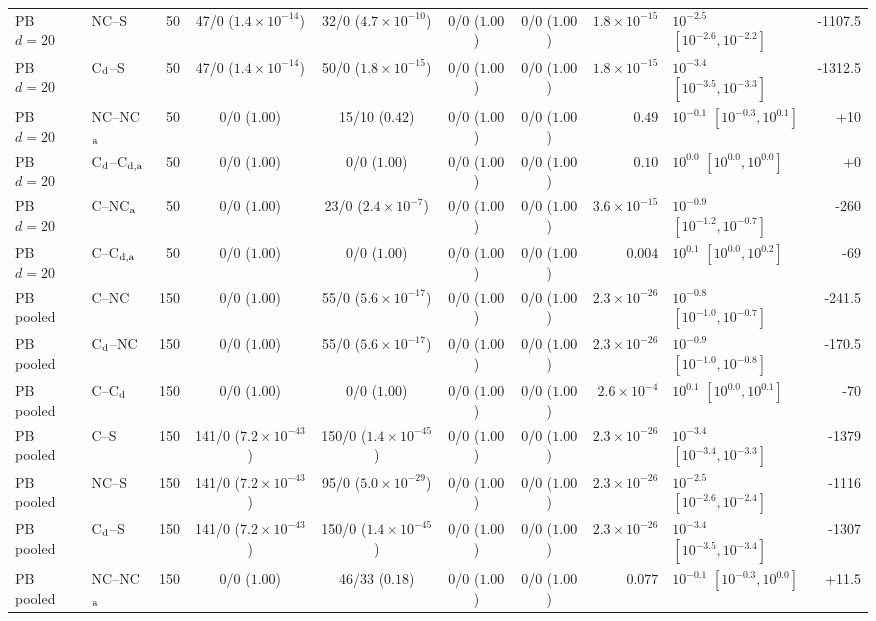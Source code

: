\begin{tabular}{@{}llr cccc r l r@{}}
PB $d=20$ & NC--S & 50 & 47/0 ($1.4\times10^{-14}$) & 32/0 ($4.7\times10^{-10}$) & 0/0 ($1.00$) & 0/0 ($1.00$) & $1.8\times10^{-15}$ & $10^{-2.5}$ $[10^{-2.6},10^{-2.2}]$ & -1107.5\\
PB $d=20$ & C$_{\rm d}$--S & 50 & 47/0 ($1.4\times10^{-14}$) & 50/0 ($1.8\times10^{-15}$) & 0/0 ($1.00$) & 0/0 ($1.00$) & $1.8\times10^{-15}$ & $10^{-3.4}$ $[10^{-3.5},10^{-3.3}]$ & -1312.5\\
PB $d=20$ & NC--NC$_{\rm a}$ & 50 & 0/0 ($1.00$) & 15/10 ($0.42$) & 0/0 ($1.00$) & 0/0 ($1.00$) & $0.49$ & $10^{-0.1}$ $[10^{-0.3},10^{0.1}]$ & +10\\
PB $d=20$ & C$_{\rm d}$--C$_{\rm d,a}$ & 50 & 0/0 ($1.00$) & 0/0 ($1.00$) & 0/0 ($1.00$) & 0/0 ($1.00$) & $0.10$ & $10^{0.0}$ $[10^{0.0},10^{0.0}]$ & +0\\
PB $d=20$ & C--NC$_{\rm a}$ & 50 & 0/0 ($1.00$) & 23/0 ($2.4\times10^{-7}$) & 0/0 ($1.00$) & 0/0 ($1.00$) & $3.6\times10^{-15}$ & $10^{-0.9}$ $[10^{-1.2},10^{-0.7}]$ & -260\\
PB $d=20$ & C--C$_{\rm d,a}$ & 50 & 0/0 ($1.00$) & 0/0 ($1.00$) & 0/0 ($1.00$) & 0/0 ($1.00$) & $0.004$ & $10^{0.1}$ $[10^{0.0},10^{0.2}]$ & -69\\
PB pooled & C--NC & 150 & 0/0 ($1.00$) & 55/0 ($5.6\times10^{-17}$) & 0/0 ($1.00$) & 0/0 ($1.00$) & $2.3\times10^{-26}$ & $10^{-0.8}$ $[10^{-1.0},10^{-0.7}]$ & -241.5\\
PB pooled & C$_{\rm d}$--NC & 150 & 0/0 ($1.00$) & 55/0 ($5.6\times10^{-17}$) & 0/0 ($1.00$) & 0/0 ($1.00$) & $2.3\times10^{-26}$ & $10^{-0.9}$ $[10^{-1.0},10^{-0.8}]$ & -170.5\\
PB pooled & C--C$_{\rm d}$ & 150 & 0/0 ($1.00$) & 0/0 ($1.00$) & 0/0 ($1.00$) & 0/0 ($1.00$) & $2.6\times10^{-4}$ & $10^{0.1}$ $[10^{0.0},10^{0.1}]$ & -70\\
PB pooled & C--S & 150 & 141/0 ($7.2\times10^{-43}$) & 150/0 ($1.4\times10^{-45}$) & 0/0 ($1.00$) & 0/0 ($1.00$) & $2.3\times10^{-26}$ & $10^{-3.4}$ $[10^{-3.4},10^{-3.3}]$ & -1379\\
PB pooled & NC--S & 150 & 141/0 ($7.2\times10^{-43}$) & 95/0 ($5.0\times10^{-29}$) & 0/0 ($1.00$) & 0/0 ($1.00$) & $2.3\times10^{-26}$ & $10^{-2.5}$ $[10^{-2.6},10^{-2.4}]$ & -1116\\
PB pooled & C$_{\rm d}$--S & 150 & 141/0 ($7.2\times10^{-43}$) & 150/0 ($1.4\times10^{-45}$) & 0/0 ($1.00$) & 0/0 ($1.00$) & $2.3\times10^{-26}$ & $10^{-3.4}$ $[10^{-3.5},10^{-3.4}]$ & -1307\\
PB pooled & NC--NC$_{\rm a}$ & 150 & 0/0 ($1.00$) & 46/33 ($0.18$) & 0/0 ($1.00$) & 0/0 ($1.00$) & $0.077$ & $10^{-0.1}$ $[10^{-0.3},10^{0.0}]$ & +11.5\\

\end{tabular}
